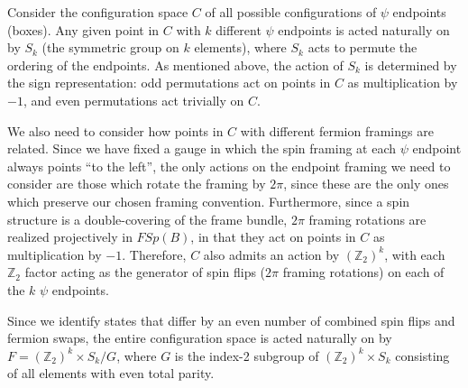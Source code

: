 \documentclass[12pt,a4paper]{article}
\newcommand{\zt}{\mathbb{Z}_2}
\begin{document}
Consider the configuration space $C$ of all possible configurations of $\psi$ endpoints (boxes). Any given point in $C$ with $k$ different $\psi$ endpoints is acted naturally on by $S_k$ (the symmetric group on $k$ elements), where $S_k$ acts to permute the ordering of the endpoints.
As mentioned above, the action of $S_k$ is determined by the sign representation: odd permutations act on points in $C$ as multiplication by $-1$, and even permutations act trivially on $C$.

We also need to consider how points in $C$ with different fermion framings are related. 
Since we have fixed a gauge in which the spin framing at each $\psi$ endpoint always points ``to the left'', the only actions on the endpoint framing we need to consider are those which rotate the framing by $2\pi$, since these are the only ones which preserve our chosen framing convention. 
Furthermore, since a spin structure is a double-covering of the frame bundle, $2\pi$ framing rotations are realized projectively in $FSp(B)$, in that they act on points in $C$ as multiplication by $-1$. 
Therefore, $C$ also admits an action by $(\zt)^k$, with each $\zt$ factor acting as the generator of spin flips ($2\pi$ framing rotations) on each of the $k$ $\psi$ endpoints.

Since we identify states that differ by an even number of combined spin flips and fermion swaps, the entire configuration space is acted naturally on by $F = (\zt)^k\times S_k / G$, 
where $G$ is the index-2 subgroup of $(\zt)^k\times S_k$ consisting of all elements with even total parity.
\end{document}
